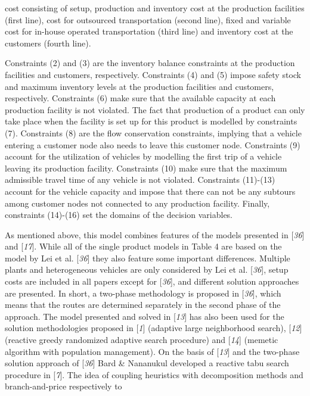  cost consisting of setup, production and inventory cost at the production facilities
 (first line), cost for outsourced transportation (second line), fixed and variable
 cost for in-house operated transportation (third line) and inventory cost at the
 customers (fourth line).\par Constraints (2) and (3) are the inventory balance constraints
 at the production facilities and customers, respectively. Constraints (4) and (5) impose safety stock and maximum inventory levels at the
 production facilities and customers, respectively. Constraints (6) make sure that the available capacity
 at each production facility is not violated. The fact that production of a product
 can only take place when the facility is set up for this product is modelled by
 constraints (7). Constraints (8) are the flow conservation
 constraints, implying that a vehicle entering a customer node also needs to leave
 this customer node. Constraints (9)
 account for the utilization of vehicles by modelling the first trip of a vehicle
 leaving its production facility. Constraints (10) make sure that the maximum admissible travel time of any
 vehicle is not violated. Constraints (11)-(13) account for the
 vehicle capacity and impose that there can not be any subtours among customer nodes
 not connected to any production facility. Finally, constraints (14)-(16) set the domains of the decision variables.\par As mentioned above, this model combines features of the models presented in [\textit{36}] and [\textit{17}]. While all of the single product models in Table 4 are based on the model by Lei et al. [\textit{36}] they also feature some important differences.
 Multiple plants and heterogeneous vehicles are only considered by Lei et al. [\textit{36}], setup costs are included in all papers
 except for [\textit{36}], and different solution
 approaches are presented. In short, a two-phase methodology is proposed in [\textit{36}], which means that the routes are determined
 separately in the second phase of the approach. The model presented and solved in
 [\textit{13}] has also been used for the solution
 methodologies proposed in [\textit{1}] (adaptive large
 neighborhood search), [\textit{12}] (reactive greedy
 randomized adaptive search procedure) and [\textit{14}]
 (memetic algorithm with population management). On the basis of [\textit{13}] and the two-phase solution approach of [\textit{36}] Bard \& Nananukul developed a reactive
 tabu search procedure in [\textit{7}]. The idea of
 coupling heuristics with decomposition methods and branch-and-price respectively to
